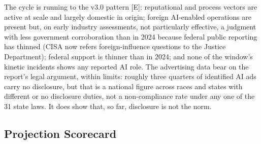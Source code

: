 \documentclass[11pt,letterpaper]{article}
\begin{document}
\begin{table}[!htbp]
\end{table}

\begin{keybox}
The cycle is running to the v3.0 pattern [E]: reputational and process vectors are active at scale and largely domestic in origin; foreign AI-enabled operations are present but, on early industry assessments, not particularly effective, a judgment with less government corroboration than in 2024 because federal public reporting has thinned (CISA now refers foreign-influence questions to the Justice Department); federal support is thinner than in 2024; and none of the window's kinetic incidents shows any reported AI role. The advertising data bear on the report's legal argument, within limits: roughly three quarters of identified AI ads carry no disclosure, but that is a national figure across races and states with different or no disclosure duties, not a non-compliance rate under any one of the 31 state laws. It does show that, so far, disclosure is not the norm.
\end{keybox}

\subsection{Projection Scorecard}
\end{document}
